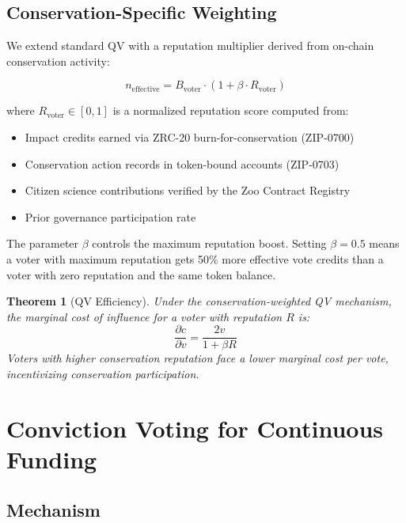 \documentclass[11pt,letterpaper]{article}
\newtheorem{theorem}{Theorem}[section]
\begin{document}
\subsection{Conservation-Specific Weighting}

We extend standard QV with a reputation multiplier derived from on-chain conservation activity:

\begin{equation}
n_{\text{effective}} = B_{\text{voter}} \cdot (1 + \beta \cdot R_{\text{voter}})
\end{equation}

where $R_{\text{voter}} \in [0, 1]$ is a normalized reputation score computed from:

\begin{itemize}
    \item Impact credits earned via ZRC-20 burn-for-conservation (ZIP-0700)
    \item Conservation action records in token-bound accounts (ZIP-0703)
    \item Citizen science contributions verified by the Zoo Contract Registry
    \item Prior governance participation rate
\end{itemize}

The parameter $\beta$ controls the maximum reputation boost. Setting $\beta = 0.5$ means a voter with maximum reputation gets 50\% more effective vote credits than a voter with zero reputation and the same token balance.

\begin{theorem}[QV Efficiency]
Under the conservation-weighted QV mechanism, the marginal cost of influence for a voter with reputation $R$ is:
\begin{equation}
\frac{\partial c}{\partial v} = \frac{2v}{1 + \beta R}
\end{equation}
Voters with higher conservation reputation face a lower marginal cost per vote, incentivizing conservation participation.
\end{theorem}

\section{Conviction Voting for Continuous Funding}
\label{sec:conviction}

\subsection{Mechanism}
\end{document}
